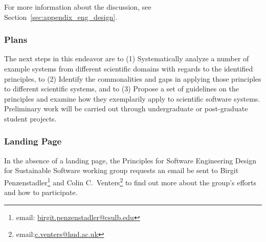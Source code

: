 For more information about the discussion, see Section~\ref{sec:appendix_eng_design}.

\subsubsection{Plans}

The next steps in this endeavor are to (1) Systematically analyze a number of
example systems from different scientific domains with regards to the identified
principles, to (2) Identify the commonalities and gaps in applying those
principles to different scientific systems, and to (3) Propose a set of
guidelines on the principles and examine how they exemplarily apply to scientific software
systems. Preliminary work will be carried out through undergraduate or
post-graduate student projects.

\subsubsection{Landing Page}

In the absence of a landing page, the Principles for Software Engineering Design
for Sustainable Software working group requests an email be sent to Birgit
Penzenstadler\footnote{email:
\href{mailto:birgit.penzenstadler@csulb.edu}{birgit.penzenstadler@csulb.edu}}
and Colin C.\
Venters\footnote{email:\href{mailto:c.venters@hud.ac.uk}{c.venters@hud.ac.uk}}
to find out more about the group's efforts and how to participate.
